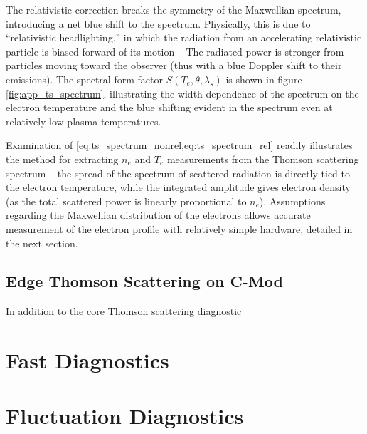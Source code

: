 \noindent The relativistic correction breaks the symmetry of the Maxwellian spectrum, introducing a net blue shift to the spectrum.  Physically, this is due to ``relativistic headlighting,'' in which the radiation from an accelerating relativistic particle is biased forward of its motion -- The radiated power is stronger from particles moving toward the observer (thus with a blue Doppler shift to their emissions).  The spectral form factor $S(T_e,\theta,\lambda_s)$ is shown in figure \cref{fig:app_ts_spectrum}, illustrating the width dependence of the spectrum on the electron temperature and the blue shifting evident in the spectrum even at relatively low plasma temperatures.

Examination of \cref{eq:ts_spectrum_nonrel,eq:ts_spectrum_rel} readily illustrates the method for extracting $n_e$ and $T_e$ measurements from the Thomson scattering spectrum -- the spread of the spectrum of scattered radiation is directly tied to the electron temperature, while the integrated amplitude gives electron density (as the total scattered power is linearly proportional to $n_e$).  Assumptions regarding the Maxwellian distribution of the electrons allows accurate measurement of the electron profile with relatively simple hardware, detailed in the next section.

\subsection{Edge Thomson Scattering on C-Mod}\label{subsec:app_ts_cmod}

In addition to the core Thomson scattering diagnostic \cite{Watterson1990,Mossessian1999}

\nicesectionending

\section{Fast Diagnostics}\label{sec:app_fast}

\nicesectionending

\section{Fluctuation Diagnostics}\label{sec:app_fluct}

\nicechapterending


